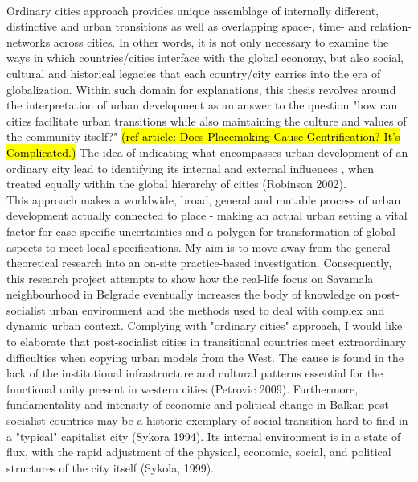 \documentclass[11pt]{report}
\begin{document}
\\
Ordinary cities approach provides unique assemblage of internally different, distinctive and  urban transitions as well as overlapping space-, time- and relation- networks across cities. In other words, it is not only necessary to examine the ways in which countries/cities interface with the global economy, but also social, cultural and historical legacies that each country/city carries into the era of globalization. Within such domain for explanations, this thesis revolves around the interpretation of urban development as an answer to the question "how can cities facilitate urban transitions while also maintaining the culture and values of the community itself?" \hl{(ref article: Does Placemaking Cause Gentrification? It’s Complicated.)} The idea of indicating what encompasses urban development of an ordinary city lead to identifying its internal and external influences , when treated equally within the global hierarchy of cities (Robinson 2002). 
\\
This approach makes a worldwide, broad, general and mutable process of urban development actually connected to place - making an actual urban setting a vital factor for case specific uncertainties and a polygon for transformation of global aspects to meet local specifications. My aim is to move away from the general theoretical research into an on-site practice-based investigation. Consequently, this research project attempts to show how the real-life focus on Savamala neighbourhood in Belgrade eventually increases the body of knowledge on post-socialist urban environment and the methods used to deal with complex and dynamic urban context. Complying with "ordinary cities" approach, I would like to elaborate that post-socialist cities in transitional countries meet extraordinary difficulties when copying urban models from the West.  The cause is found in the lack of the institutional infrastructure and cultural patterns essential for the functional unity present in western cities (Petrovic 2009). Furthermore, fundamentality and intensity of economic and political change in Balkan post-socialist countries may be a historic exemplary of social transition hard to find in a "typical" capitalist city (Sykora 1994). Its internal environment is in a state of flux, with the rapid adjustment of the physical, economic, social, and political structures of the city itself (Sykola, 1999).
\\
\end{document}
